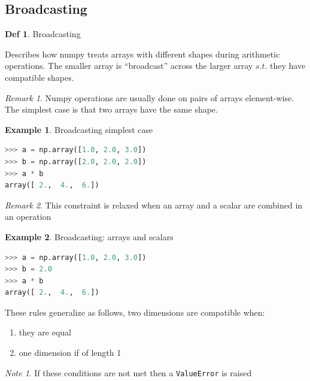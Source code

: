 \documentclass{article}
\theoremstyle{definition}
\newtheorem{df}{Def}
\newtheorem{ex}{Example}[subsection]
\theoremstyle{remark}
\newtheorem*{rem}{Remark}
\newtheorem*{nb}{Note}
\begin{document}
\break


\subsection{Broadcasting}

\begin{df}Broadcasting

Describes how numpy treats arrays with different shapes during arithmetic operations. The smaller array is ``broadcast'' across the larger array $ s.t. $ they have compatible shapes.
\end{df}

\begin{rem}
Numpy operations are usually done on pairs of arrays element-wise. The simplest case is that two arrays have the same shape.
\end{rem}


\begin{ex}Broadcasting simplest case
\begin{lstlisting}[language=Python]
>>> a = np.array([1.0, 2.0, 3.0])
>>> b = np.array([2.0, 2.0, 2.0])
>>> a * b
array([ 2.,  4.,  6.])
\end{lstlisting}
\end{ex}


\begin{rem}
This constraint is relaxed when an array and a scalar are combined in an operation
\end{rem}

\begin{ex}Broadcasting: arrays and scalars
\begin{lstlisting}[language=Python]
>>> a = np.array([1.0, 2.0, 3.0])
>>> b = 2.0
>>> a * b
array([ 2.,  4.,  6.])
\end{lstlisting}
\end{ex}

\noindent These rules generalize as follows, two dimensions are compatible when:

\begin{enumerate}
    \item they are equal

    \item one dimension if of length 1
\end{enumerate}

\begin{nb}
If these conditions are not met then a \lstinline{ValueError} is raised
\end{nb}
\end{document}
